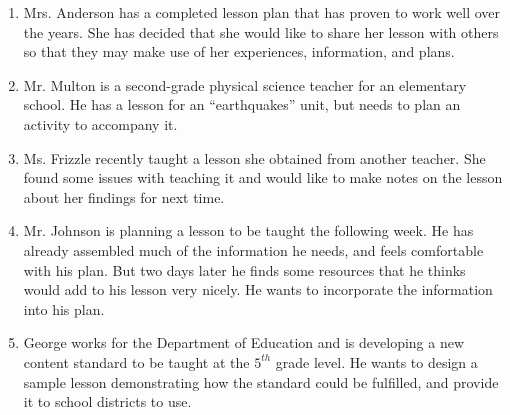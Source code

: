 \begin{enumerate}
\item Mrs. Anderson has a completed lesson plan that has proven to work well over
      the years.  She has decided that she would like to share her lesson with
      others so that they may make use of her experiences, information, and
      plans.

\item Mr. Multon is a second-grade physical science teacher for an elementary school.
      He has a lesson for an ``earthquakes'' unit, but needs to plan an activity
      to accompany it.

\item Ms. Frizzle recently taught a lesson she obtained from another teacher.  She
      found some issues with teaching it and would like to make notes on the lesson
      about her findings for next time.

\item Mr. Johnson is planning a lesson to be taught the following week.  He has
      already assembled much of the information he needs, and feels comfortable
      with his plan.  But two days later he finds some resources that he thinks
      would add to his lesson very nicely.  He wants to incorporate the information
      into his plan.

\item George works for the Department of Education and is developing a new content
      standard to be taught at the $5^{th}$ grade level.  He wants to design a
      sample lesson demonstrating how the standard could be fulfilled, and provide
      it to school districts to use.
\end{enumerate}

